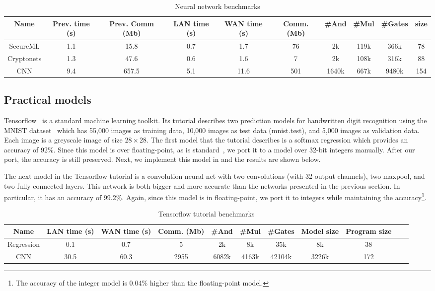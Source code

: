 \begin{table*}
\begin{tabular}{c|c|c|c |c|c|c|c|c|c}
Name  & Prev. time (s) & Prev. Comm (Mb) & LAN time (s) & WAN time (s) & Comm. (Mb)  & \#And & \#Mul & \#Gates & size\\
\hline
SecureML   &  1.1 & 15.8 & 0.7 & 1.7  & 76   &  2k   & 119k & 366k   & 78\\
\hline
Cryptonets &  1.3 & 47.6 & 0.6 & 1.6  & 7    & 2k    & 108k & 316k & 88\\
\hline
CNN        &  9.4 & 657.5& 5.1 & 11.6 & 501  & 1640k & 667k & 9480k & 154\\
\hline
\end{tabular}

 \caption{Neural network benchmarks}
 \label{tab:nn} 
\end{table*}


\subsection{Practical models}
Tensorflow~\cite{tensorflow} is a standard machine learning toolkit.
Its tutorial describes two prediction models for handwritten digit recognition
using the MNIST dataset~\cite{mnist} which has 55,000 images as training data,
10,000 images as test data (mnist.test), and 5,000 images as validation data.
Each image is a greyscale image of size $28\times 28$.
The first model that the tutorial describes is a softmax regression
which provides an accuracy of 92\%. Since this model is over floating-point,
as is standard~\cite{secureml,minionn}, we port it to a model over 32-bit integers manually. After our port, the accuracy is still preserved.
Next, we implement this model in \tool and the results are shown below.

The next model in the Tensorflow tutorial is a convolution neural net with two convolutions
(with 32 output channels), two maxpool, and two fully connected layers.
This network is both bigger and more accurate than the networks presented in the previous section.
In particular, it has an accuracy of 99.2\%. Again, since this model is in floating-point,
we port it to integers while maintaining the accuracy\footnote{The accuracy of the integer model is 0.04\% higher than the floating-point model.}.


\begin{table*}
\begin{tabular}{c|c|c|c |c|c|c|c|c|c | c}
Name       & LAN time (s) & WAN time (s) & Comm. (Mb)  & \#And & \#Mul & \#Gates & Model size & Program size\\
\hline
Regression &  0.1         & 0.7         & 5            & 2k    & 8k    &  35k    & 8k   & 38\\
\hline
CNN        &  30.5        & 60.3        & 2955         & 6082k & 4163k &  42104k & 3226k& 172\\
\hline
\end{tabular}

 \caption{Tensorflow tutorial benchmarks}
 \label{tab:tf} 
\end{table*}


